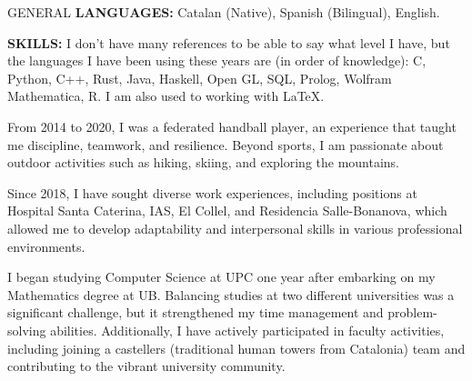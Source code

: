 \documentclass{resume} %
\begin{document}
\begin{rSection}{GENERAL}
\textbf{LANGUAGES:} Catalan (Native), Spanish (Bilingual), English. 

\textbf{SKILLS:}
I don't have many references to be able to say what level I have, but the languages I have been using these years are (in order of knowledge): C, Python, C++, Rust, Java, Haskell, Open GL, SQL, Prolog, Wolfram Mathematica, R. I am also used to working with \LaTeX. 


From 2014 to 2020, I was a federated handball player, an experience that taught me discipline, teamwork, and resilience. Beyond sports, I am passionate about outdoor activities such as hiking, skiing, and exploring the mountains.

Since 2018, I have sought diverse work experiences, including positions at Hospital Santa Caterina, IAS, El Collel, and Residencia Salle-Bonanova, which allowed me to develop adaptability and interpersonal skills in various professional environments.

I began studying Computer Science at UPC one year after embarking on my Mathematics degree at UB. Balancing studies at two different universities was a significant challenge, but it strengthened my time management and problem-solving abilities. Additionally, I have actively participated in faculty activities, including joining a castellers (traditional human towers from Catalonia) team and contributing to the vibrant university community.

\end{rSection} 
\end{document}

